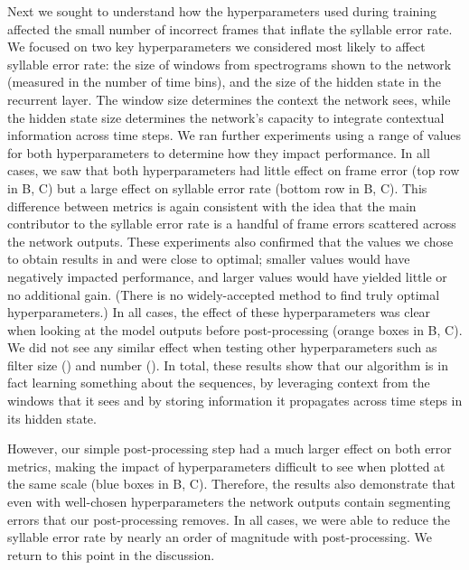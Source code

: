 \documentclass[9pt,lineno]{elife}
\begin{document}
Next we sought to understand how the hyperparameters used during training 
affected the small number of incorrect frames that inflate the syllable error rate. 
We focused on two key hyperparameters we considered most likely to affect syllable error rate: 
the size of windows from spectrograms shown to the network (measured in the number of time bins), 
and the size of the hidden state in the recurrent layer.
The window size determines the context the network sees, 
while the hidden state size determines the network's capacity to integrate 
contextual information across time steps.
We ran further experiments using a range of values for both hyperparameters 
to determine how they impact performance.
In all cases, we saw that both hyperparameters had little effect on frame error 
(top row in B, C) 
but a large effect on syllable error rate 
(bottom row in B, C).
This difference between metrics is again consistent with the idea 
that the main contributor to the syllable error rate 
is a handful of frame errors scattered across the network outputs. 
These experiments also confirmed that the values we chose to obtain results in  and 
were close to optimal; 
smaller values would have negatively impacted performance, 
and larger values would have yielded little or no additional gain.
(There is no widely-accepted method to find truly optimal hyperparameters.)
In all cases, the effect of these hyperparameters was clear 
when looking at the model outputs before post-processing 
(orange boxes in B, C). 
We did not see any similar effect when testing other hyperparameters 
such as filter size () and number ().\textbf{}
In total, these results show that our algorithm is in fact learning something about the sequences, 
by leveraging context from the windows that it sees 
and by storing information it propagates across time steps in its hidden state. 

However, our simple post-processing step had a much larger effect on both error metrics, 
making the impact of hyperparameters difficult to see when plotted at the same scale 
(blue boxes in B, C).
Therefore, the results also demonstrate that even with well-chosen hyperparameters 
the network outputs contain segmenting errors that our post-processing removes. 
In all cases, we were able to reduce the syllable error rate by nearly an order of magnitude with post-processing. 
We return to this point in the discussion. 
\end{document}
